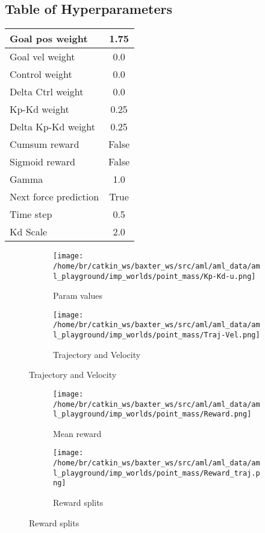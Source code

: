 \documentclass{article}%
\begin{document}
\subsection{Table of Hyperparameters}%
\label{subsec:Table of Hyperparameters}%
\renewcommand{\arraystretch}{1.4}%
\begin{tabular}{|l|c||}%
\hline%
Goal pos weight&1.75\\%
\hline%
\hline%
Goal vel weight&0.0\\%
\hline%
\hline%
Control weight&0.0\\%
\hline%
\hline%
Delta Ctrl weight&0.0\\%
\hline%
\hline%
Kp{-}Kd weight&0.25\\%
\hline%
\hline%
Delta Kp{-}Kd weight&0.25\\%
\hline%
\hline%
Cumsum reward&False\\%
\hline%
\hline%
Sigmoid reward&False\\%
\hline%
\hline%
Gamma&1.0\\%
\hline%
\hline%
Next force prediction&True\\%
\hline%
\hline%
Time step&0.5\\%
\hline%
\hline%
Kd Scale&2.0\\%
\hline%
\end{tabular}

%


\begin{figure}[h!]%
\begin{subfigure}[b]{0.45\linewidth}%
\texttt{[image: /home/br/catkin\_ws/baxter\_ws/src/aml/aml\_data/aml\_playground/imp\_worlds/point\_mass/Kp-Kd-u.png]}%
\caption{Param values}%
\end{subfigure}%
\begin{subfigure}[b]{0.45\linewidth}%
\texttt{[image: /home/br/catkin\_ws/baxter\_ws/src/aml/aml\_data/aml\_playground/imp\_worlds/point\_mass/Traj-Vel.png]}%
\caption{Trajectory and Velocity}%
\end{subfigure}%
\end{figure}

%


\begin{figure}[h!]%
\begin{subfigure}[b]{0.45\linewidth}%
\texttt{[image: /home/br/catkin\_ws/baxter\_ws/src/aml/aml\_data/aml\_playground/imp\_worlds/point\_mass/Reward.png]}%
\caption{Mean reward}%
\end{subfigure}%
\begin{subfigure}[b]{0.45\linewidth}%
\texttt{[image: /home/br/catkin\_ws/baxter\_ws/src/aml/aml\_data/aml\_playground/imp\_worlds/point\_mass/Reward\_traj.png]}%
\caption{Reward splits}%
\end{subfigure}%
\end{figure}

%
\end{document}
